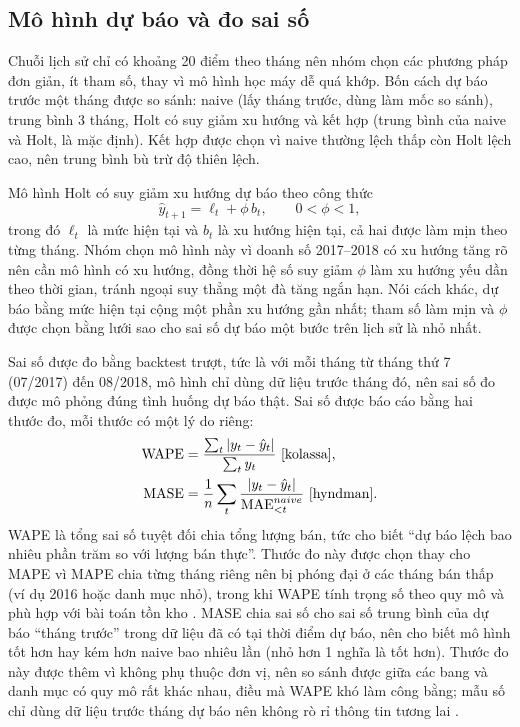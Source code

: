 \subsection{Mô hình dự báo và đo sai số}
Chuỗi lịch sử chỉ có khoảng 20 điểm theo tháng nên nhóm chọn các phương pháp đơn giản, ít tham số, thay vì mô hình học máy dễ quá khớp. Bốn cách dự báo trước một tháng được so sánh: naive (lấy tháng trước, dùng làm mốc so sánh), trung bình 3 tháng, Holt có suy giảm xu hướng và kết hợp (trung bình của naive và Holt, là mặc định). Kết hợp được chọn vì naive thường lệch thấp còn Holt lệch cao, nên trung bình bù trừ độ thiên lệch.

Mô hình Holt có suy giảm xu hướng \cite{fpp} dự báo theo công thức
\begin{equation}
\hat y_{t+1}=\ell_t+\phi\, b_t,\qquad 0<\phi<1,
\end{equation}
trong đó $\ell_t$ là mức hiện tại và $b_t$ là xu hướng hiện tại, cả hai được làm mịn theo từng tháng. Nhóm chọn mô hình này vì doanh số 2017--2018 có xu hướng tăng rõ nên cần mô hình có xu hướng, đồng thời hệ số suy giảm $\phi$ làm xu hướng yếu dần theo thời gian, tránh ngoại suy thẳng một đà tăng ngắn hạn. Nói cách khác, dự báo bằng mức hiện tại cộng một phần xu hướng gần nhất; tham số làm mịn và $\phi$ được chọn bằng lưới sao cho sai số dự báo một bước trên lịch sử là nhỏ nhất.

Sai số được đo bằng backtest trượt, tức là với mỗi tháng từ tháng thứ 7 (07/2017) đến 08/2018, mô hình chỉ dùng dữ liệu trước tháng đó, nên sai số đo được mô phỏng đúng tình huống dự báo thật. Sai số được báo cáo bằng hai thước đo, mỗi thước có một lý do riêng:
\begin{align}
\mathrm{WAPE}&=\frac{\sum_t |y_t-\hat y_t|}{\sum_t y_t}\ \text{\cite{kolassa}},\\
\mathrm{MASE}&=\frac{1}{n}\sum_t \frac{|y_t-\hat y_t|}{\mathrm{MAE}^{naive}_{<t}}\ \text{\cite{hyndman}}.
\end{align}
WAPE là tổng sai số tuyệt đối chia tổng lượng bán, tức cho biết ``dự báo lệch bao nhiêu phần trăm so với lượng bán thực''. Thước đo này được chọn thay cho MAPE vì MAPE chia từng tháng riêng nên bị phóng đại ở các tháng bán thấp (ví dụ 2016 hoặc danh mục nhỏ), trong khi WAPE tính trọng số theo quy mô và phù hợp với bài toán tồn kho \cite{kolassa}. MASE chia sai số cho sai số trung bình của dự báo ``tháng trước'' trong dữ liệu đã có tại thời điểm dự báo, nên cho biết mô hình tốt hơn hay kém hơn naive bao nhiêu lần (nhỏ hơn 1 nghĩa là tốt hơn). Thước đo này được thêm vì không phụ thuộc đơn vị, nên so sánh được giữa các bang và danh mục có quy mô rất khác nhau, điều mà WAPE khó làm công bằng; mẫu số chỉ dùng dữ liệu trước tháng dự báo nên không rò rỉ thông tin tương lai \cite{hyndman}.

